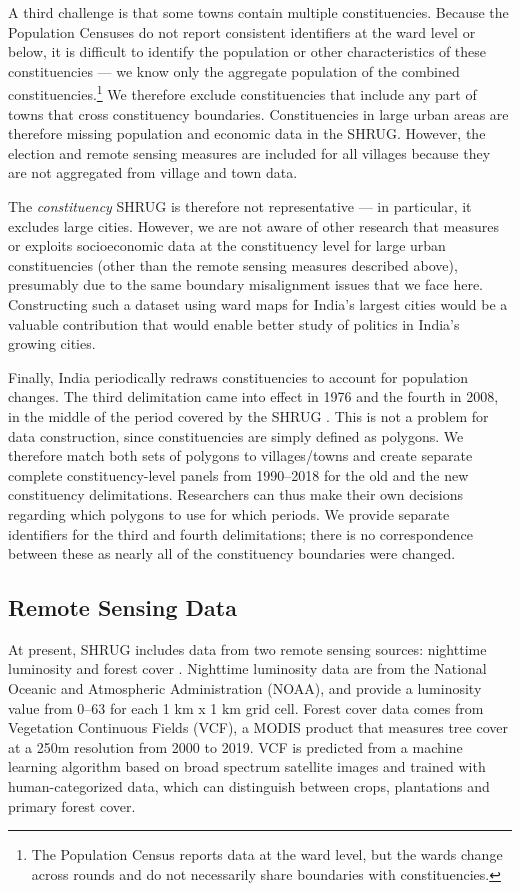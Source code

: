 \documentclass[12pt,letterpaper]{article}
\begin{document}
A third challenge is that some towns contain multiple
constituencies. Because the Population Censuses do not report
consistent identifiers at the ward level or below, it is difficult to
identify the population or other characteristics of these
constituencies --- we know only the aggregate population of the
combined constituencies.\footnote{The Population Census reports data
  at the ward level, but the wards change across rounds and do not
  necessarily share boundaries with constituencies.} We therefore
exclude constituencies that include any part of towns that cross
constituency boundaries. Constituencies in large urban areas are
therefore missing population and economic data in the SHRUG. However,
the election and remote sensing measures are included for all villages
because they are not aggregated from village and town data.

The \textit{constituency} SHRUG is therefore not representative --- in
particular, it excludes large cities. However, we are not aware of
other research that measures or exploits socioeconomic data at the
constituency level for large urban constituencies (other than the
remote sensing measures described above), presumably due to the same
boundary misalignment issues that we face here. Constructing such a
dataset using ward maps for India's largest cities would be a valuable
contribution that would enable better study of politics in India's
growing cities.

Finally, India periodically redraws constituencies to account for
population changes. The third delimitation came into effect in 1976
and the fourth in 2008, in the middle of the period covered by the
SHRUG \cite{Iyer2013}. This is not a problem for data construction,
since constituencies are simply defined as polygons. We therefore
match both sets of polygons to villages/towns and create separate
complete constituency-level panels from 1990--2018 for the old and the
new constituency delimitations. Researchers can thus make their own
decisions regarding which polygons to use for which periods. We
provide separate identifiers for the third and fourth delimitations;
there is no correspondence between these as nearly all of the
constituency boundaries were changed.

\subsection*{Remote Sensing Data}

At present, SHRUG includes data from two remote sensing sources:
nighttime luminosity \cite{henderson2009b} and forest cover
\cite{agn2019deforest,townshend2011}. Nighttime luminosity data are
from the National Oceanic and Atmospheric Administration (NOAA), and
provide a luminosity value from 0--63 for each 1 km x 1 km grid
cell. Forest cover data comes from Vegetation Continuous Fields (VCF),
a MODIS product that measures tree cover at a 250m resolution from
2000 to 2019. VCF is predicted from a machine learning algorithm based
on broad spectrum satellite images and trained with human-categorized
data, which can distinguish between crops, plantations and primary
forest cover.
\end{document}
